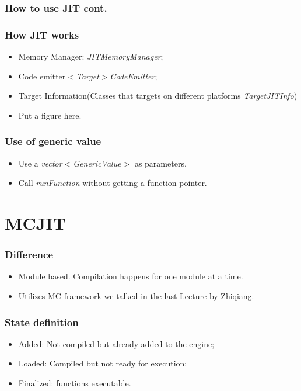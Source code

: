 \documentclass{beamer}
\begin{document}
\begin{frame}
\frametitle{How to use JIT cont.}
\JITCodeOne
\end{frame}

\begin{frame}
\frametitle{How JIT works}
	\begin{itemize}
		\item Memory Manager: \textit{JITMemoryManager};
		\item Code emitter\textit{$<$Target$>$CodeEmitter};
		\item Target Information(Classes that targets on different platforms \textit{TargetJITInfo})
		\item Put a figure here.
	\end{itemize}
\end{frame}

\begin{frame}
\frametitle{Use of generic value}
\begin{itemize}
	\item Use a \textit{vector$<$GenericValue$>$} as parameters.
	\item Call \textit{runFunction} without getting a function pointer.
\end{itemize}
\JITCodeTwo
\end{frame}

\section{MCJIT}
\begin{frame}
\frametitle{Difference}
\begin{itemize}
	\item Module based. Compilation happens for one module at a time.
	\item Utilizes MC framework we talked in the last Lecture by Zhiqiang.
\end{itemize}
\end{frame}

\begin{frame}
\frametitle{State definition}
\begin{itemize}
	\item Added: Not compiled but already added to the engine;
	\item Loaded: Compiled but not ready for execution;
	\item Finalized: functions executable.
\end{itemize}
\end{frame}
\end{document}
